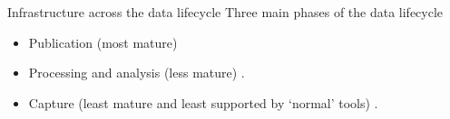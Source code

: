 

\begin{frame}{Infrastructure across the data lifecycle}
    Three main phases of the data lifecycle
    \begin{itemize}
        \item Publication (most mature)
        \item Processing and analysis (less mature) \parencite{Stewart_Lowndes2017-lj, Alveo2019-tk} .
        \item Capture (least mature and least supported by `normal' tools) \parencite{Bureau_of_Reclamation2017-xl}.
    \end{itemize}
\end{frame}
